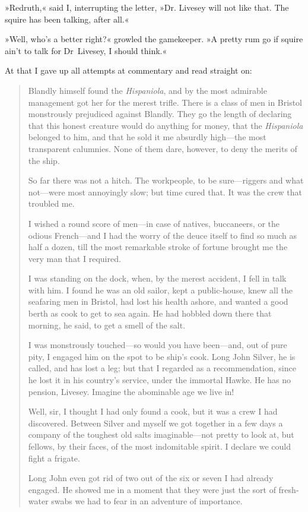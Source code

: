 »Redruth,« said I, interrupting the letter, »Dr. Livesey will not like that. The squire has been talking, after all.«

»Well, who's a better right?« growled the gamekeeper. »A pretty rum go if squire ain't to talk for Dr~Livesey, I should think.«

At that I gave up all attempts at commentary and read straight on:

\begin{quotation}
Blandly himself found the \textit{Hispaniola}, and by the most admirable management got her for the merest trifle. There is a class of men in Bristol monstrously prejudiced against Blandly. They go the length of declaring that this honest creature would do anything for money, that the \textit{Hispaniola} belonged to him, and that he sold it me absurdly high—the most transparent calumnies. None of them dare, however, to deny the merits of the ship.

So far there was not a hitch. The workpeople, to be sure—riggers and what not—were most annoyingly slow; but time cured that. It was the crew that troubled me.

I wished a round score of men—in case of natives, buccaneers, or the odious French—and I had the worry of the deuce itself to find so much as half a dozen, till the most remarkable stroke of fortune brought me the very man that I required.

I was standing on the dock, when, by the merest accident, I fell in talk with him. I found he was an old sailor, kept a public-house, knew all the seafaring men in Bristol, had lost his health ashore, and wanted a good berth as cook to get to sea again. He had hobbled down there that morning, he said, to get a smell of the salt.

I was monstrously touched—so would you have been—and, out of pure pity, I engaged him on the spot to be ship's cook. Long John Silver, he is called, and has lost a leg; but that I regarded as a recommendation, since he lost it in his country's service, under the immortal Hawke. He has no pension, Livesey. Imagine the abominable age we live in!

Well, sir, I thought I had only found a cook, but it was a crew I had discovered. Between Silver and myself we got together in a few days a company of the toughest old salts imaginable—not pretty to look at, but fellows, by their faces, of the most indomitable spirit. I declare we could fight a frigate.


Long John even got rid of two out of the six or seven I had already engaged. He showed me in a moment that they were just the sort of fresh-water swabs we had to fear in an adventure of importance.


\end{quotation}
